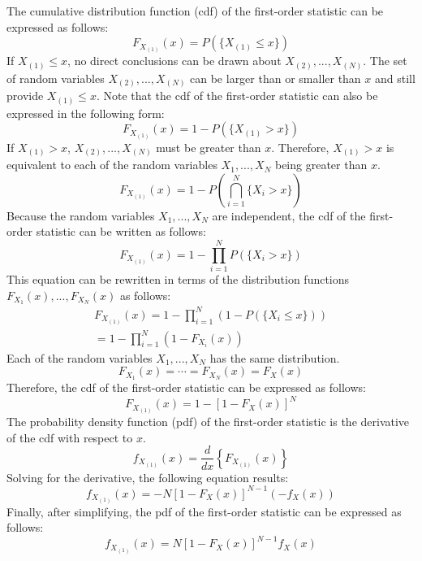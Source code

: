 \documentclass[conference]{IEEEtran}
\begin{document}
The cumulative distribution function (cdf) of the first-order statistic can be expressed as follows:
\begin{equation}
F_{X_{(1)}}(x) = P(\{X_{(1)} \leq x\})
\end{equation}
If $X_{(1)} \leq x$, no direct conclusions can be drawn about %
$X_{(2)},...,X_{(N)}$. The set of random variables $X_{(2)},...,X_{(N)}$ can be larger than or smaller than $x$ and still provide $X_{(1)} \leq x$. Note that the cdf of the first-order statistic can also be expressed in the following form:
\begin{equation}
F_{X_{(1)}}(x) = 1 - P(\{X_{(1)} > x\})
\end{equation}
If $X_{(1)} > x$, $X_{(2)},...,X_{(N)}$ must be greater than $x$. Therefore, $X_{(1)} > x$ is equivalent to each of the random variables $X_1,...,X_N$ being greater than $x$. 
\begin{equation}
F_{X_{(1)}}(x) = 1 - P\left(\bigcap_{i=1}^N\{X_i > x\}\right)
\end{equation}
Because the random variables $X_1,...,X_N$ are independent, the cdf of the first-order statistic can be written as follows:
\begin{equation}
F_{X_{(1)}}(x) = 1 - \prod_{i=1}^N P(\{X_i > x\})
\end{equation}
This equation can be rewritten in terms of the distribution functions $F_{X_1}(x),...,F_{X_N}(x)$ as follows:
\begin{equation}
\begin{gathered}
F_{X_{(1)}}(x) = 1 - \prod_{i=1}^N (1-P(\{X_i \leq x\}))\\
= 1 - \prod_{i=1}^N (1-F_{X_i}(x))
\end{gathered}
\end{equation}
Each of the random variables $X_1,...,X_N$ has the same distribution.
\begin{equation}
F_{X_1}(x)=\cdots=F_{X_N}(x)=F_X(x)
\end{equation}
Therefore, the cdf of the first-order statistic can be expressed as follows: 
\begin{equation}
F_{X_{(1)}}(x) = 1 - [1 - F_X(x)]^N
\end{equation}
The probability density function (pdf) of the first-order statistic is the derivative of the cdf with respect to $x$.
\begin{equation}
f_{X_{(1)}}(x) = \frac{d}{dx}\left\{F_{X_{(1)}}(x)\right\}
\end{equation}
Solving for the derivative, the following equation results:
\begin{equation}
f_{X_{(1)}}(x) = -N[1 - F_X(x)]^{N-1}(-f_X(x))
\end{equation}
Finally, after simplifying, the pdf of the first-order statistic can be expressed as follows:
\begin{equation}
f_{X_{(1)}}(x) = N[1 - F_X(x)]^{N-1}f_X(x)
\end{equation}
\end{document}

